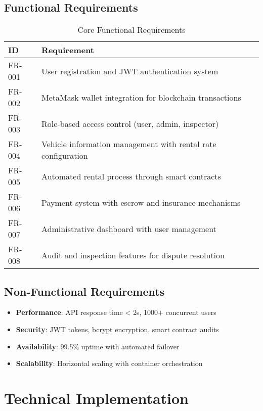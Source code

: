 \documentclass[11pt,a4paper]{article}
\begin{document}
\subsection{Functional Requirements}
\begin{table}[H]
\centering
\begin{tabular}{|l|p{8cm}|}
\hline
\textbf{ID} & \textbf{Requirement} \\
\hline
FR-001 & User registration and JWT authentication system \\
FR-002 & MetaMask wallet integration for blockchain transactions \\
FR-003 & Role-based access control (user, admin, inspector) \\
FR-004 & Vehicle information management with rental rate configuration \\
FR-005 & Automated rental process through smart contracts \\
FR-006 & Payment system with escrow and insurance mechanisms \\
FR-007 & Administrative dashboard with user management \\
FR-008 & Audit and inspection features for dispute resolution \\
\hline
\end{tabular}
\caption{Core Functional Requirements}
\end{table}

\subsection{Non-Functional Requirements}
\begin{itemize}
    \item \textbf{Performance}: API response time < 2s, 1000+ concurrent users
    \item \textbf{Security}: JWT tokens, bcrypt encryption, smart contract audits
    \item \textbf{Availability}: 99.5\% uptime with automated failover
    \item \textbf{Scalability}: Horizontal scaling with container orchestration
\end{itemize}

\section{Technical Implementation}
\end{document}
